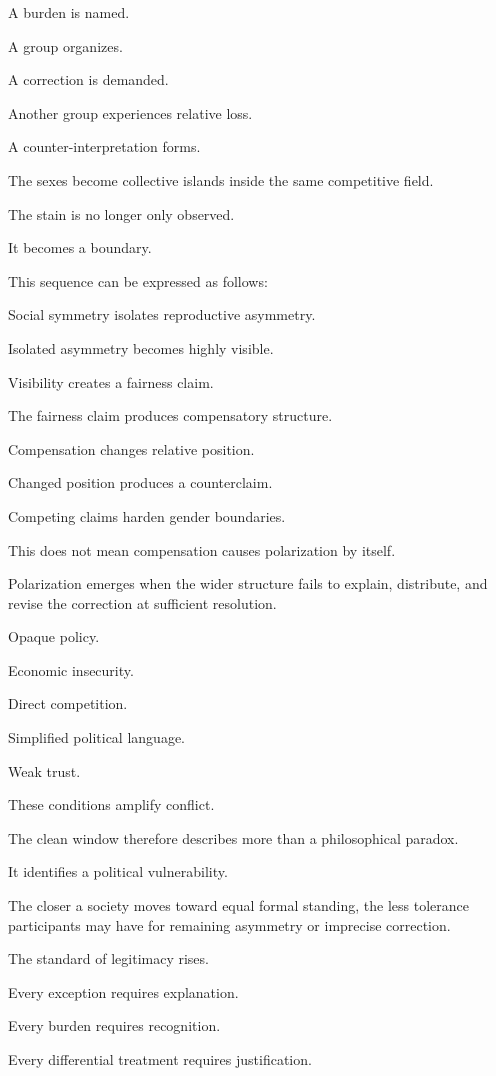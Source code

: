 A burden is named.

A group organizes.

A correction is demanded.

Another group experiences relative loss.

A counter-interpretation forms.

The sexes become collective islands inside the same competitive field.

The stain is no longer only observed.

It becomes a boundary.

This sequence can be expressed as follows:

Social symmetry isolates reproductive asymmetry.

Isolated asymmetry becomes highly visible.

Visibility creates a fairness claim.

The fairness claim produces compensatory structure.

Compensation changes relative position.

Changed position produces a counterclaim.

Competing claims harden gender boundaries.

This does not mean compensation causes polarization by itself.

Polarization emerges when the wider structure fails to explain, distribute, and revise the correction at sufficient resolution.

Opaque policy.

Economic insecurity.

Direct competition.

Simplified political language.

Weak trust.

These conditions amplify conflict.

The clean window therefore describes more than a philosophical paradox.

It identifies a political vulnerability.

The closer a society moves toward equal formal standing, the less tolerance participants may have for remaining asymmetry or imprecise correction.

The standard of legitimacy rises.

Every exception requires explanation.

Every burden requires recognition.

Every differential treatment requires justification.

